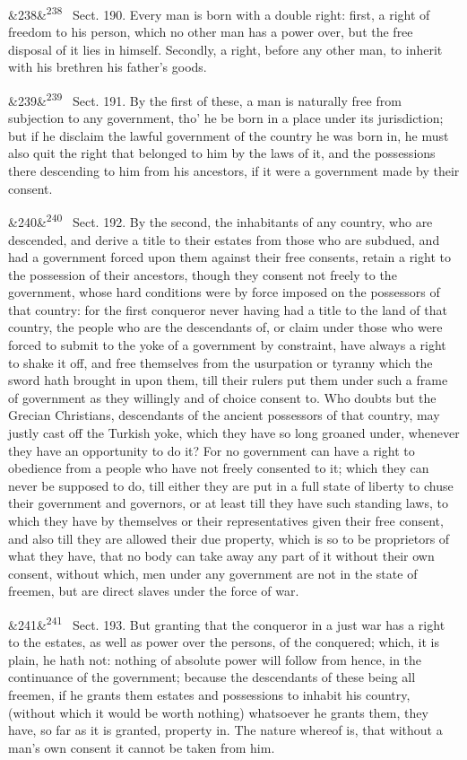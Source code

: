 \documentclass[12pt]{article}
\newcommand{\para}[1][]{\par\noindent\ifx&#1&\else\textsuperscript{\footnotesize #1}~\fi}
\begin{document}
\para[238] Sect. 190. Every man is born with a double right: first, a right of freedom to his person, which no other man has a power over, but the free disposal of it lies in himself. Secondly, a right, before any other man, to inherit with his brethren his father's goods.

\para[239] Sect. 191. By the first of these, a man is naturally free from subjection to any government, tho' he be born in a place under its jurisdiction; but if he disclaim the lawful government of the country he was born in, he must also quit the right that belonged to him by the laws of it, and the possessions there descending to him from his ancestors, if it were a government made by their consent.

\para[240] Sect. 192. By the second, the inhabitants of any country, who are descended, and derive a title to their estates from those who are subdued, and had a government forced upon them against their free consents, retain a right to the possession of their ancestors, though they consent not freely to the government, whose hard conditions were by force imposed on the possessors of that country: for the first conqueror never having had a title to the land of that country, the people who are the descendants of, or claim under those who were forced to submit to the yoke of a government by constraint, have always a right to shake it off, and free themselves from the usurpation or tyranny which the sword hath brought in upon them, till their rulers put them under such a frame of government as they willingly and of choice consent to. Who doubts but the Grecian Christians, descendants of the ancient possessors of that country, may justly cast off the Turkish yoke, which they have so long groaned under, whenever they have an opportunity to do it? For no government can have a right to obedience from a people who have not freely consented to it; which they can never be supposed to do, till either they are put in a full state of liberty to chuse their government and governors, or at least till they have such standing laws, to which they have by themselves or their representatives given their free consent, and also till they are allowed their due property, which is so to be proprietors of what they have, that no body can take away any part of it without their own consent, without which, men under any government are not in the state of freemen, but are direct slaves under the force of war.

\para[241] Sect. 193. But granting that the conqueror in a just war has a right to the estates, as well as power over the persons, of the conquered; which, it is plain, he hath not: nothing of absolute power will follow from hence, in the continuance of the government; because the descendants of these being all freemen, if he grants them estates and possessions to inhabit his country, (without which it would be worth nothing) whatsoever he grants them, they have, so far as it is granted, property in. The nature whereof is, that without a man's own consent it cannot be taken from him.
\end{document}
